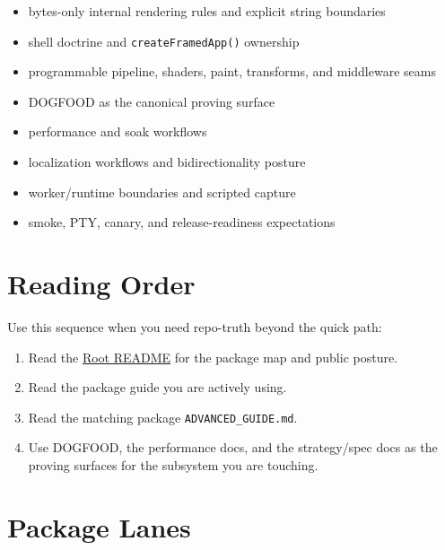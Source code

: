 \begin{itemize}
\tightlist
\item
  bytes-only internal rendering rules and explicit string boundaries
\item
  shell doctrine and \texttt{c\allowbreak{}r\allowbreak{}e\allowbreak{}a\allowbreak{}t\allowbreak{}e\allowbreak{}F\allowbreak{}r\allowbreak{}a\allowbreak{}m\allowbreak{}e\allowbreak{}d\allowbreak{}A\allowbreak{}p\allowbreak{}p\allowbreak{}(\allowbreak{})} ownership
\item
  programmable pipeline, shaders, paint, transforms, and middleware seams
\item
  DOGFOOD as the canonical proving surface
\item
  performance and soak workflows
\item
  localization workflows and bidirectionality posture
\item
  worker/runtime boundaries and scripted capture
\item
  smoke, PTY, canary, and release-readiness expectations
\end{itemize}

\section{Reading Order}\label{record-001-reading-order}

Use this sequence when you need repo-truth beyond the quick path:

\begin{enumerate}
\def\labelenumi{\arabic{enumi}.}
\tightlist
\item
  Read the \href{https://github.com/flyingrobots/bijou/blob/cbd70612140e7a450d764b3c7be1c6af878b99bc/README.md}{Root README} for the package map and public posture.
\item
  Read the package guide you are actively using.
\item
  Read the matching package \texttt{A\allowbreak{}D\allowbreak{}V\allowbreak{}A\allowbreak{}N\allowbreak{}C\allowbreak{}E\allowbreak{}D\allowbreak{}\_\allowbreak{}G\allowbreak{}U\allowbreak{}I\allowbreak{}D\allowbreak{}E\allowbreak{}.\allowbreak{}m\allowbreak{}d}.
\item
  Use DOGFOOD, the performance docs, and the strategy/spec docs as the proving surfaces for the subsystem you are touching.
\end{enumerate}

\section{Package Lanes}\label{record-001-package-lanes}

